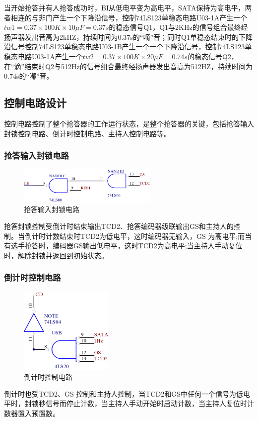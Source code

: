 \documentclass{../source/Experiment}
\begin{document}
        当开始抢答并有人抢答成功时，BI从低电平变为高电平，SATA保持为高电平，两者相连的与非门产生一个下降沿信号，控制74LS123单稳态电路U03-1A产生一个$tw1 = 0.37\times 100K \times 10 \mu F = 0.37s$的稳态信号Q1，Q1与2KHz的信号组合最终经扬声器发出音高为2kHZ，持续时间为0.37s的“嘀”音；同时Q1单稳态结束时的下降沿信号控制74LS123单稳态电路U03-1B产生一个一个下降沿信号，控制74LS123单稳态电路U03-1A产生一个$tw2 = 0.37\times 100K \times 20 \mu F = 0.74s$的稳态信号Q2，在“滴”结束时Q2与512Hz的信号组合最终经扬声器发出音高为512HZ，持续时间为0.74s的“嘟”音。

        \subsection{控制电路设计}
        控制电路控制了整个抢答器的工作运行状态，是整个抢答器的关键，包括抢答输入封锁控制电路、倒计时控制电路、主持人控制电路等。
            \subsubsection{抢答输入封锁电路}
                \begin{figure}[H]
                    \centering
                    \includegraphics[width = 0.6\textwidth]{pic/封锁.png}
                    \caption{抢答输入封锁电路}
                \end{figure}
            抢答封锁控制受倒计时结束输出TCD2、抢答编码器级联输出GS和主持人的控制。当倒计时计数结束时TCD2为低电平，这时编码器无输入，GS 为高电平;而当有选手抢答时，编码器GS输出低电平，这时TCD2为高电平;当主持人手动复位时，解除封锁并返回到初始状态。
            \subsubsection{倒计时控制电路}
                \begin{figure}[H]
                    \centering
                    \includegraphics[width = 0.4\textwidth]{pic/倒计时.png}
                    \caption{倒计时控制电路}
                \end{figure}
            倒计时也受TCD2、GS 控制和主持人控制，当TCD2和GS中任何一个信号为低电平时，封锁秒信号而停止计数，当主持人手动开始时启动计数，当主持人复位时计数器置入预置数。
\end{document}
